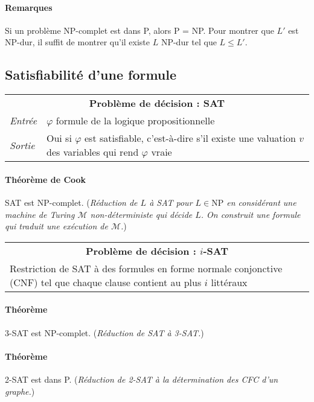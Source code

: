 \documentclass[french]{article}
\newcommand{\NP}{\mathrm{NP}}
\begin{document}
\paragraph{Remarques} Si un problème NP-complet est dans P, alors P = NP. Pour montrer que $L'$ est NP-dur, il suffit de montrer qu'il existe $L$ NP-dur tel que $L \leq L'$.

\subsection{Satisfiabilité d'une formule}

\vspace{0.5cm}
\begin{tabularx}{\textwidth}{p{1cm}X}
\multicolumn{2}{c}{\textbf{Problème de décision : SAT}} \\ 
\emph{Entrée} & $\varphi$ formule de la logique propositionnelle \\ 
\emph{Sortie} & Oui si $\varphi$ est satisfiable, c'est-à-dire s'il existe une valuation $v$ des variables qui rend $\varphi$ vraie \\
\end{tabularx}

\paragraph{Théorème de Cook} SAT est NP-complet. (\emph{Réduction de $L$ à SAT pour $L \in \NP$ en considérant une machine de Turing $\mathcal{M}$ non-déterministe qui décide $L$. On construit une formule qui traduit une exécution de $\mathcal{M}$.})

\vspace{0.5cm}
\begin{tabularx}{\textwidth}{X}
\multicolumn{1}{c}{\textbf{Problème de décision : $i$-SAT}} \\ 
Restriction de SAT à des formules en forme normale conjonctive (CNF) tel que chaque clause contient au plus $i$ littéraux \\
\end{tabularx}

\paragraph{Théorème} 3-SAT est NP-complet. (\emph{Réduction de SAT à 3-SAT.})

\paragraph{Théorème} 2-SAT est dans P. (\emph{Réduction de 2-SAT à la détermination des CFC d'un graphe.})
\end{document}
